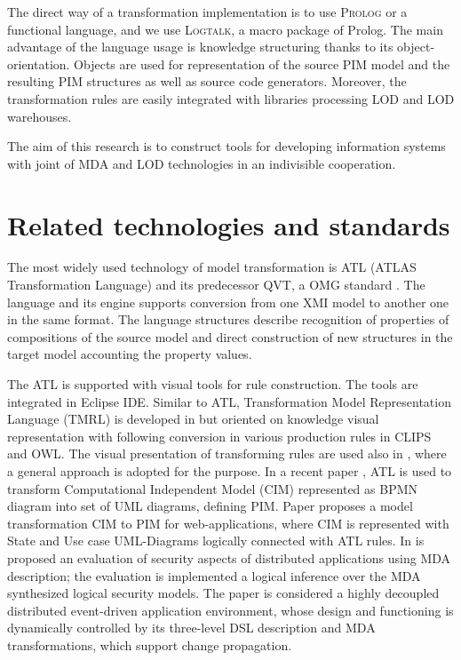 \documentclass[runningheads]{llncs}
\begin{document}
The direct way of a transformation implementation is to use \textsc{Prolog} or a functional language, and we use \textsc{Logtalk}, a macro package of Prolog.  The main advantage of the language usage is knowledge structuring thanks to its object-orientation.  Objects are used for representation of the source PIM model and the resulting PIM structures as well as source code generators.  Moreover, the transformation rules are easily integrated with libraries processing LOD and LOD warehouses.

The aim of this research is to construct tools for developing information systems with joint of MDA and LOD technologies in an indivisible cooperation.


\section{Related technologies and standards}
\label{sec:rel}

The most widely used technology of model transformation is ATL (ATLAS Transformation Language) \cite{atl} and its predecessor QVT, a OMG standard \cite{QVT}.  The language and its engine supports conversion from one XMI model to another one in the same format.  The language structures describe recognition of properties of compositions of the source model and direct construction of new structures in the target model accounting the property values.

The ATL is supported with visual tools for rule construction.  The tools are integrated in Eclipse IDE.  Similar to ATL, Transformation Model Representation Language (TMRL) is developed in \cite{nikita} but oriented on knowledge visual representation with following conversion in various production rules in CLIPS and OWL.  The visual presentation of transforming rules are used also in \cite{GT}, where a general approach is adopted for the purpose.  In a recent paper \cite{azis}, ATL is used to transform Computational Independent Model (CIM) represented as BPMN diagram into set of UML diagrams, defining PIM. Paper \cite{Rhazali} proposes a model transformation CIM to PIM for web-applications, where CIM is represented with State and Use case UML-Diagrams logically connected with ATL rules.  In \cite{Hamid} is proposed an evaluation of security aspects of distributed applications using MDA description; the evaluation is implemented a logical inference over the MDA synthesized logical security models. The paper \cite{Zdun} is considered a highly decoupled distributed event-driven application environment, whose design and functioning is dynamically controlled by its three-level DSL description and MDA transformations, which support change propagation.
\end{document}
